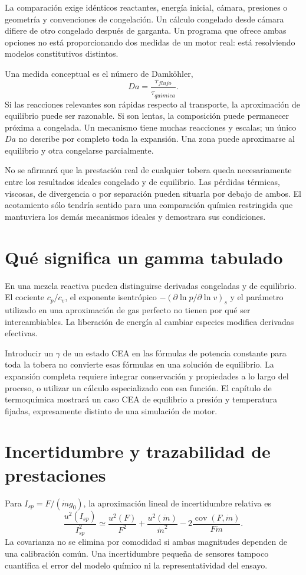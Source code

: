 La comparación exige idénticos reactantes, energía inicial, cámara, presiones o geometría y convenciones de congelación. Un cálculo congelado desde cámara difiere de otro congelado después de garganta. Un programa que ofrece ambas opciones no está proporcionando dos medidas de un motor real: está resolviendo modelos constitutivos distintos.

Una medida conceptual es el número de Damköhler,
\[
 Da=\frac{\tau_{flujo}}{\tau_{quimica}}.
\]
Si las reacciones relevantes son rápidas respecto al transporte, la aproximación de equilibrio puede ser razonable. Si son lentas, la composición puede permanecer próxima a congelada. Un mecanismo tiene muchas reacciones y escalas; un único $Da$ no describe por completo toda la expansión. Una zona puede aproximarse al equilibrio y otra congelarse parcialmente.

No se afirmará que la prestación real de cualquier tobera queda necesariamente entre los resultados ideales congelado y de equilibrio. Las pérdidas térmicas, viscosas, de divergencia o por separación pueden situarla por debajo de ambos. El acotamiento sólo tendría sentido para una comparación química restringida que mantuviera los demás mecanismos ideales y demostrara sus condiciones.
\section{Qué significa un gamma tabulado}
En una mezcla reactiva pueden distinguirse derivadas congeladas y de equilibrio. El cociente $c_p/c_v$, el exponente isentrópico $-(\partial\ln p/\partial\ln v)_s$ y el parámetro utilizado en una aproximación de gas perfecto no tienen por qué ser intercambiables. La liberación de energía al cambiar especies modifica derivadas efectivas.

Introducir un $\gamma$ de un estado CEA en las fórmulas de potencia constante para toda la tobera no convierte esas fórmulas en una solución de equilibrio. La expansión completa requiere integrar conservación y propiedades a lo largo del proceso, o utilizar un cálculo especializado con esa función. El capítulo de termoquímica mostrará un caso CEA de equilibrio a presión y temperatura fijadas, expresamente distinto de una simulación de motor.
\section{Incertidumbre y trazabilidad de prestaciones}
Para $I_{sp}=F/(\dot m g_0)$, la aproximación lineal de incertidumbre relativa es
\[
 \frac{u^2(I_{sp})}{I_{sp}^2}\simeq
 \frac{u^2(F)}{F^2}+\frac{u^2(\dot m)}{\dot m^2}
 -2\frac{\operatorname{cov}(F,\dot m)}{F\dot m}.
\]
La covarianza no se elimina por comodidad si ambas magnitudes dependen de una calibración común. Una incertidumbre pequeña de sensores tampoco cuantifica el error del modelo químico ni la representatividad del ensayo.

